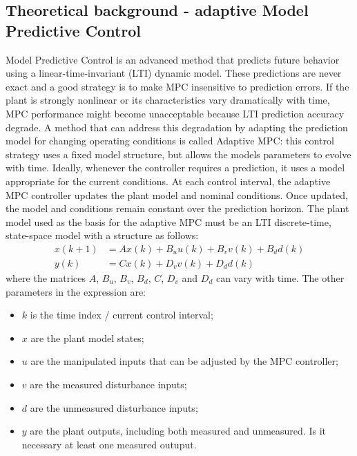 \documentclass[conference, 11pt]{IEEEtran}
\begin{document}
\subsection{Theoretical background - adaptive Model Predictive Control}
Model Predictive Control is an advanced method that predicts future behavior using a linear-time-invariant (LTI) dynamic model. These predictions are never exact and a good strategy is
to make MPC insensitive to prediction errors. If the plant is strongly nonlinear or its characteristics vary dramatically with time, MPC performance might become unacceptable because LTI prediction accuracy degrade. A method that can address this degradation by adapting the prediction model for changing operating conditions is called Adaptive MPC: this control strategy uses a fixed model structure, but allows the models parameters to evolve with time. Ideally, whenever the controller requires a prediction, it uses a model appropriate for the current conditions. At each control interval, the adaptive MPC controller updates the plant model and nominal conditions. Once updated, the model and conditions remain constant over the prediction horizon. The plant model used as the basis for the adaptive MPC must be an LTI discrete-time, state-space model with a structure as follows:
\begin{equation*}
\label{eqn:Adaptive_MPC_plant_discrete}
\begin{aligned}
x(k+1)&=Ax(k)+ B_u u(k)+B_v v(k)+B_d d(k)\\
y(k)&=Cx(k) + D_v v(k)+ D_d d(k)
\end{aligned}
\end{equation*}
where the matrices $A$, $B_u$, $B_v$, $B_d$, $C$, $D_v$ and $D_d$ can vary with time. The other parameters in the expression are:
\begin{itemize}
	\item $k$ is the time index / current control interval;
	\item $x$ are the plant model states;
	\item $u$ are the manipulated inputs that can be adjusted by the MPC controller;
	\item $v$ are the measured disturbance inputs;
	\item $d$ are the unmeasured disturbance inputs;
	\item $y$ are the plant outputs, including both measured and unmeasured. Is it necessary at least one measured outuput.
\end{itemize}
\end{document}
